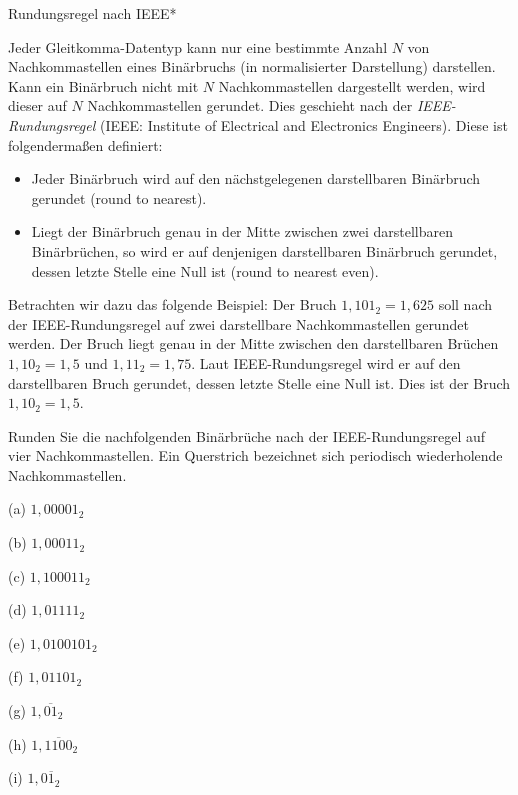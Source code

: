 \begin{exercise}{Rundungsregel nach IEEE*}

\begin{body}
Jeder Gleitkomma-Datentyp kann nur eine bestimmte Anzahl $N$ von Nachkommastellen eines Binärbruchs (in normalisierter Darstellung) darstellen. Kann ein Binärbruch nicht mit $N$ Nachkommastellen dargestellt werden, wird dieser auf $N$ Nachkommastellen gerundet. Dies geschieht nach der \emph{IEEE-Rundungsregel} (IEEE: Institute of Electrical and Electronics Engineers). Diese ist folgendermaßen definiert:
\begin{itemize}
\item
Jeder Binärbruch wird auf den nächstgelegenen darstellbaren Binärbruch gerundet (\glqq round to nearest\grqq).

\item
Liegt der Binärbruch genau in der Mitte zwischen zwei darstellbaren Binärbrüchen, so wird er auf denjenigen darstellbaren Binärbruch gerundet, dessen letzte Stelle eine Null ist (\glqq round to nearest even\grqq).
\end{itemize}
Betrachten wir dazu das folgende Beispiel: Der Bruch $1{,}101_2 = 1{,}625$ soll nach der IEEE-Rundungsregel auf zwei darstellbare Nachkommastellen gerundet werden. Der Bruch liegt genau in der Mitte zwischen den darstellbaren Brüchen $1{,}10_2 = 1{,}5$ und $1{,}11_2 = 1{,}75$. Laut IEEE-Rundungsregel wird er auf den darstellbaren Bruch gerundet, dessen letzte Stelle eine Null ist. Dies ist der Bruch $1{,}10_2 = 1{,}5$.

Runden Sie die nachfolgenden Binärbrüche nach der IEEE-Rundungsregel auf vier Nachkommastellen. Ein Querstrich bezeichnet sich periodisch wiederholende Nachkommastellen.
\begin{center}
\begin{minipage}{0.3\textwidth}
\begin{parts}
\item[(a)] $1{,}00001_2$
\item[(b)] $1{,}00011_2$
\item[(c)] $1{,}100011_2$
\end{parts}
\end{minipage}
\begin{minipage}{0.3\textwidth}
\begin{parts}
\item[(d)] $1{,}01111_2$
\item[(e)] $1{,}0100101_2$
\item[(f)] $1{,}01101_2$
\end{parts}
\end{minipage}
\begin{minipage}{0.3\textwidth}
\begin{parts}
\item[(g)] $1{,}\overline{01}_2$
\item[(h)] $1{,}\overline{1100}_2$
\item[(i)] $1{,}0\overline{1}_2$
\end{parts}
\end{minipage}
\end{center}
\end{body}



\end{exercise}
